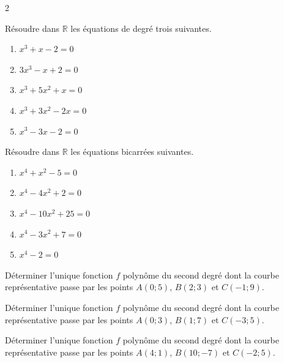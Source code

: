 \documentclass[a4paper,12pt]{article}
\begin{document}
\begin{multicols}{2}
\begin{exercice}[title=Exercice 21 \quad$\star\star$\quad\  {[Calculer]}]{}{}
Résoudre dans \( \mathbb{R} \) les équations de degré trois suivantes.
\begin{enumerate}
    \item \(x^3 + x - 2 = 0\)
    \item \(3x^3 - x + 2 = 0\)
    \item \(x^3 + 5x^2 + x = 0\)
    \item \(x^3 + 3x^2 - 2x = 0\)
    \item \(x^3 - 3x - 2 = 0\)
\end{enumerate}
\end{exercice}

\begin{exercice}[title=Exercice 22 \quad$\star\star$\quad\  {[Calculer]}]{}{}
Résoudre dans \( \mathbb{R} \) les équations bicarrées suivantes.
\begin{enumerate}
    \item \(x^4 + x^2 - 5 = 0\)
    \item \(x^4 - 4x^2 + 2 = 0\)
    \item \(x^4 - 10x^2 + 25 = 0\)
    \item \(x^4 - 3x^2 + 7 = 0\)
    \item \(x^4 - 2 = 0\)
\end{enumerate}
\end{exercice}

\begin{exercice}[title=Exercice 23 \quad$\star\star$\quad\ {[Calculer, Représenter]}]{}{}
Déterminer l’unique fonction \( f \) polynôme du second degré dont la courbe représentative passe par les points \( A(0;5) \), \( B(2;3) \) et \( C(-1;9) \).
\end{exercice}

\begin{exercice}[title=Exercice 24 \quad$\star\star$\quad\ {[Calculer, Représenter]}]{}{}
Déterminer l’unique fonction \( f \) polynôme du second degré dont la courbe représentative passe par les points \( A(0;3) \), \( B(1;7) \) et \( C(-3;5) \).
\end{exercice}

\begin{exercice}[title=Exercice 25 \quad$\star\star\star$\quad\ {[Calculer, Représenter]}]{}{}
Déterminer l’unique fonction \( f \) polynôme du second degré dont la courbe représentative passe par les points \( A(4;1) \), \( B(10;-7) \) et \( C(-2;5) \).
\end{exercice}


\end{multicols}
\end{document}
